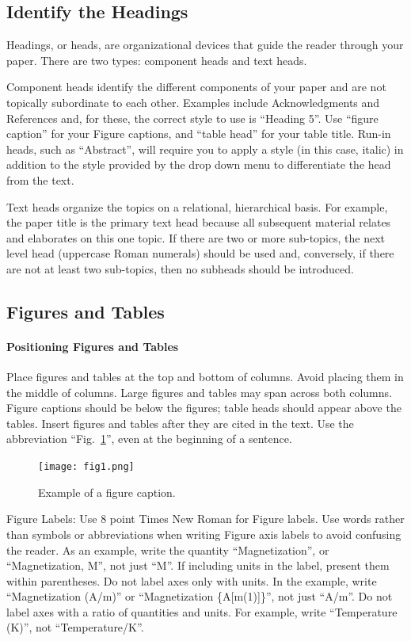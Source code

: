 \documentclass[conference]{IEEEtran}
\begin{document}
\subsection{Identify the Headings}
Headings, or heads, are organizational devices that guide the reader through 
your paper. There are two types: component heads and text heads.

Component heads identify the different components of your paper and are not 
topically subordinate to each other. Examples include Acknowledgments and 
References and, for these, the correct style to use is ``Heading 5''. Use 
``figure caption'' for your Figure captions, and ``table head'' for your 
table title. Run-in heads, such as ``Abstract'', will require you to apply a 
style (in this case, italic) in addition to the style provided by the drop 
down menu to differentiate the head from the text.

Text heads organize the topics on a relational, hierarchical basis. For 
example, the paper title is the primary text head because all subsequent 
material relates and elaborates on this one topic. If there are two or more 
sub-topics, the next level head (uppercase Roman numerals) should be used 
and, conversely, if there are not at least two sub-topics, then no subheads 
should be introduced.

\subsection{Figures and Tables}
\paragraph{Positioning Figures and Tables} Place figures and tables at the top and 
bottom of columns. Avoid placing them in the middle of columns. Large 
figures and tables may span across both columns. Figure captions should be 
below the figures; table heads should appear above the tables. Insert 
figures and tables after they are cited in the text. Use the abbreviation 
``Fig.~\ref{fig}'', even at the beginning of a sentence.

\begin{figure}[htbp]
\centerline{\texttt{[image: fig1.png]}}
\caption{Example of a figure caption.}
\label{fig}
\end{figure}

Figure Labels: Use 8 point Times New Roman for Figure labels. Use words 
rather than symbols or abbreviations when writing Figure axis labels to 
avoid confusing the reader. As an example, write the quantity 
``Magnetization'', or ``Magnetization, M'', not just ``M''. If including 
units in the label, present them within parentheses. Do not label axes only 
with units. In the example, write ``Magnetization (A/m)'' or ``Magnetization 
\{A[m(1)]\}'', not just ``A/m''. Do not label axes with a ratio of 
quantities and units. For example, write ``Temperature (K)'', not 
``Temperature/K''.
\end{document}

